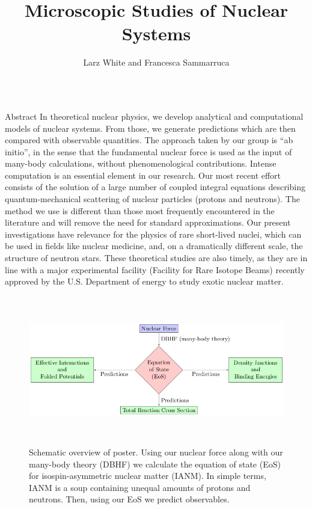 \documentclass[serif]{beamer}
\title{Microscopic Studies of Nuclear Systems}
\author{Larz White and Francesca Sammarruca}
\institute{Department of Physics, University of Idaho, Moscow ID USA*}
\begin{document}
\unitlength=1mm
\begin{frame}{}
\begin{columns}[t]
\begin{column}{0.32\paperwidth}
\begin{block}{Abstract}
In theoretical nuclear physics, we develop analytical and computational models of nuclear systems. From those, we generate predictions which are then compared with observable quantities. The approach taken by our group is ``ab initio'', in the sense that the fundamental nuclear force is used as the input of many-body calculations, without phenomenological contributions. Intense computation is an essential element in our research. Our most recent effort consists of the solution of a large number of coupled integral equations describing quantum-mechanical scattering of nuclear particles (protons and neutrons). The method we use is different than those most frequently encountered in the literature and will remove the need for standard approximations. Our present investigations have relevance for the physics of rare short-lived nuclei, which can be used in fields like nuclear medicine, and, on a dramatically different scale, the structure of neutron stars. These theoretical studies are also timely, as they are in line with a major experimental facility (Facility for Rare Isotope Beams) recently approved by the U.S. Department of energy to study exotic nuclear matter.
\begin{figure}[H]
\begin{center}
\includegraphics[width=17.6cm,height=6.5cm]{flowchart}
\caption{Schematic overview of poster. Using our nuclear force along with our many-body theory (DBHF) we calculate the equation of state (EoS) for isospin-asymmetric nuclear matter (IANM). In simple terms, IANM is a soup containing unequal amounts of protons and neutrons. Then, using our EoS we predict observables.\label{fig:flowchart}}
\end{center}

\end{figure}
\end{block}
\end{column}
\end{columns}
\end{frame}
\end{document}

